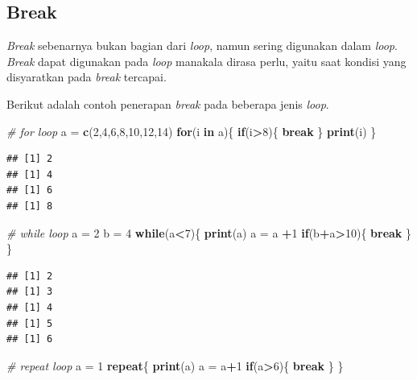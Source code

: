 \documentclass[]{book}
\newenvironment{Shaded}{\begin{snugshade}}{\end{snugshade}}
\newcommand{\CommentTok}[1]{\textcolor[rgb]{0.56,0.35,0.01}{\textit{#1}}}
\newcommand{\ControlFlowTok}[1]{\textcolor[rgb]{0.13,0.29,0.53}{\textbf{#1}}}
\newcommand{\DecValTok}[1]{\textcolor[rgb]{0.00,0.00,0.81}{#1}}
\newcommand{\KeywordTok}[1]{\textcolor[rgb]{0.13,0.29,0.53}{\textbf{#1}}}
\newcommand{\NormalTok}[1]{#1}
\newcommand{\OperatorTok}[1]{\textcolor[rgb]{0.81,0.36,0.00}{\textbf{#1}}}
\newcommand{\StringTok}[1]{\textcolor[rgb]{0.31,0.60,0.02}{#1}}
\theoremstyle{definition}
\theoremstyle{definition}
\theoremstyle{definition}
\theoremstyle{remark}
\begin{document}
\hypertarget{break}{%
\subsection{Break}\label{break}}

\emph{Break} sebenarnya bukan bagian dari \emph{loop}, namun sering digunakan dalam \emph{loop}. \emph{Break} dapat digunakan pada \emph{loop} manakala dirasa perlu, yaitu saat kondisi yang disyaratkan pada \emph{break} tercapai.

Berikut adalah contoh penerapan \emph{break} pada beberapa jenis \emph{loop}.

\begin{Shaded}
\begin{Highlighting}[]
\CommentTok{# for loop}
\NormalTok{a =}\StringTok{ }\KeywordTok{c}\NormalTok{(}\DecValTok{2}\NormalTok{,}\DecValTok{4}\NormalTok{,}\DecValTok{6}\NormalTok{,}\DecValTok{8}\NormalTok{,}\DecValTok{10}\NormalTok{,}\DecValTok{12}\NormalTok{,}\DecValTok{14}\NormalTok{)}
\ControlFlowTok{for}\NormalTok{(i }\ControlFlowTok{in}\NormalTok{ a)\{}
  \ControlFlowTok{if}\NormalTok{(i}\OperatorTok{>}\DecValTok{8}\NormalTok{)\{}
    \ControlFlowTok{break}
\NormalTok{  \}}
  \KeywordTok{print}\NormalTok{(i)}
\NormalTok{\}}
\end{Highlighting}
\end{Shaded}

\begin{verbatim}
## [1] 2
## [1] 4
## [1] 6
## [1] 8
\end{verbatim}

\begin{Shaded}
\begin{Highlighting}[]
\CommentTok{# while loop}
\NormalTok{a =}\StringTok{ }\DecValTok{2}
\NormalTok{b =}\StringTok{ }\DecValTok{4}
\ControlFlowTok{while}\NormalTok{(a}\OperatorTok{<}\DecValTok{7}\NormalTok{)\{}
  \KeywordTok{print}\NormalTok{(a)}
\NormalTok{  a =}\StringTok{ }\NormalTok{a }\OperatorTok{+}\DecValTok{1}
  \ControlFlowTok{if}\NormalTok{(b}\OperatorTok{+}\NormalTok{a}\OperatorTok{>}\DecValTok{10}\NormalTok{)\{}
    \ControlFlowTok{break}
\NormalTok{  \}}
\NormalTok{\}}
\end{Highlighting}
\end{Shaded}

\begin{verbatim}
## [1] 2
## [1] 3
## [1] 4
## [1] 5
## [1] 6
\end{verbatim}

\begin{Shaded}
\begin{Highlighting}[]
\CommentTok{# repeat loop}
\NormalTok{a =}\StringTok{ }\DecValTok{1}
\ControlFlowTok{repeat}\NormalTok{\{}
  \KeywordTok{print}\NormalTok{(a)}
\NormalTok{  a =}\StringTok{ }\NormalTok{a}\OperatorTok{+}\DecValTok{1}
  \ControlFlowTok{if}\NormalTok{(a}\OperatorTok{>}\DecValTok{6}\NormalTok{)\{}
    \ControlFlowTok{break}
\NormalTok{  \}}
\NormalTok{\}}
\end{Highlighting}
\end{Shaded}
\end{document}
